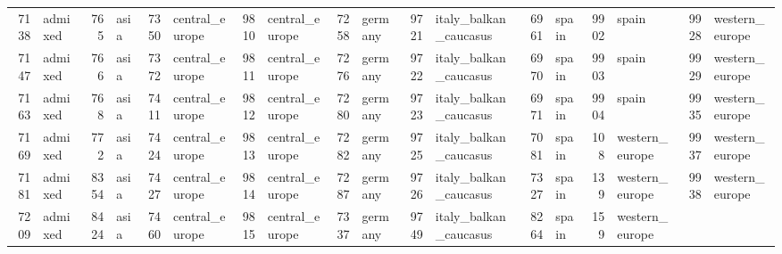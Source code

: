 \begin{table}[h]
{\begin{tabular}{rl|rl|rl|rl|rl|rl|rl|rl|rl}
			7138                   & admixed         & 765                    & asia            & 7350                   & central\_europe & 9810                   & central\_europe & 7258                   & germany                 & 9721                   & italy\_balkan\_caucasus & 6961                   & spain           & 9902                   & spain           & \multicolumn{1}{r}{9928} & western\_europe \\
			7147                   & admixed         & 766                    & asia            & 7372                   & central\_europe & 9811                   & central\_europe & 7276                   & germany                 & 9722                   & italy\_balkan\_caucasus & 6970                   & spain           & 9903                   & spain           & \multicolumn{1}{r}{9929} & western\_europe \\
			7163                   & admixed         & 768                    & asia            & 7411                   & central\_europe & 9812                   & central\_europe & 7280                   & germany                 & 9723                   & italy\_balkan\_caucasus & 6971                   & spain           & 9904                   & spain           & \multicolumn{1}{r}{9935} & western\_europe \\
			7169                   & admixed         & 772                    & asia            & 7424                   & central\_europe & 9813                   & central\_europe & 7282                   & germany                 & 9725                   & italy\_balkan\_caucasus & 7081                   & spain           & 108                    & western\_europe & \multicolumn{1}{r}{9937} & western\_europe \\
			7181                   & admixed         & 8354                   & asia            & 7427                   & central\_europe & 9814                   & central\_europe & 7287                   & germany                 & 9726                   & italy\_balkan\_caucasus & 7327                   & spain           & 139                    & western\_europe & \multicolumn{1}{r}{9938} & western\_europe \\
			7209                   & admixed         & 8424                   & asia            & 7460                   & central\_europe & 9815                   & central\_europe & 7337                   & germany                 & 9749                   & italy\_balkan\_caucasus & 8264                   & spain           & 159                    & western\_europe &                          &                 \\

\end{tabular}}
\end{table}
